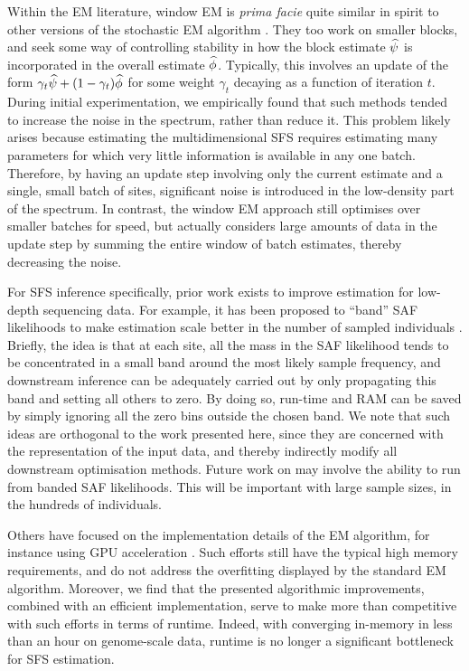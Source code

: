 Within the EM literature, window EM is \emph{prima facie} quite similar in spirit to other versions of the stochastic EM algorithm \cite{Neal1998,Sato2000,Cappe2009,Liang2009,Chen2018}.
They too work on smaller blocks, and seek some way of controlling stability in how the block estimate $\bsfs$ is incorporated in the overall estimate $\estsfs$.
Typically, this involves an update of the form $\gamma_t \bsfs + (1 - \gamma_t) \estsfs$ for some weight $\gamma_t$ decaying as a function of iteration $t$.
During initial experimentation, we empirically found that such methods tended to increase the noise in the spectrum, rather than reduce it.
This problem likely arises because estimating the multidimensional SFS requires estimating many parameters for which very little information is available in any one batch.
Therefore, by having an update step involving only the current estimate and a single, small batch of sites, significant noise is introduced in the low-density part of the spectrum.
In contrast, the window EM approach still optimises over smaller batches for speed, but actually considers large amounts of data in the update step by summing the entire window of batch estimates, thereby decreasing the noise.

For SFS inference specifically, prior work exists to improve estimation for low-depth sequencing data.
For example, it has been proposed to \enquote{band} SAF likelihoods to make estimation scale better in the number of sampled individuals \cite{Han2014,MasSandoval2022}.
Briefly, the idea is that at each site, all the mass in the SAF likelihood tends to be concentrated in a small band around the most likely sample frequency, and downstream inference can be adequately carried out by only propagating this band  and setting all others to zero.
By doing so, run-time and RAM can be saved by simply ignoring all the zero bins outside the chosen band.
We note that such ideas are orthogonal to the work presented here, since they are concerned with the representation of the input data, and thereby indirectly modify all downstream optimisation methods.
Future work on \winsfs may involve the ability to run from banded SAF likelihoods.
This will be important with large sample sizes, in the hundreds of individuals. 

Others have focused on the implementation details of the EM algorithm, for instance using GPU acceleration \cite{Lu2012}.
Such efforts still have the typical high memory requirements, and do not address the overfitting displayed by the standard EM algorithm.
Moreover, we find that the presented algorithmic improvements, combined with an efficient implementation, serve to make \winsfs more than competitive with such efforts in terms of runtime.
Indeed, with \winsfs converging in-memory in less than an hour on genome-scale data, runtime is no longer a significant bottleneck for SFS estimation.


